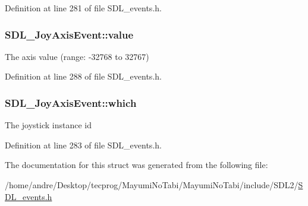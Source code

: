 Definition at line 281 of file S\-D\-L\-\_\-events.\-h.

\hypertarget{struct_s_d_l___joy_axis_event_a53ee73e7c367934dd6edb69963be5556}{
\subsubsection[{value}]{ S\-D\-L\-\_\-\-Joy\-Axis\-Event\-::value}}\label{struct_s_d_l___joy_axis_event_a53ee73e7c367934dd6edb69963be5556}
The axis value (range\-: -\/32768 to 32767) 

Definition at line 288 of file S\-D\-L\-\_\-events.\-h.

\hypertarget{struct_s_d_l___joy_axis_event_a965719f4703a7091bcc5f07f79fcf7e1}{
\subsubsection[{which}]{ S\-D\-L\-\_\-\-Joy\-Axis\-Event\-::which}}\label{struct_s_d_l___joy_axis_event_a965719f4703a7091bcc5f07f79fcf7e1}
The joystick instance id 

Definition at line 283 of file S\-D\-L\-\_\-events.\-h.



The documentation for this struct was generated from the following file\-:\begin{DoxyCompactItemize}
\item 
/home/andre/\-Desktop/tecprog/\-Mayumi\-No\-Tabi/\-Mayumi\-No\-Tabi/include/\-S\-D\-L2/\hyperlink{_s_d_l__events_8h}{S\-D\-L\-\_\-events.\-h}\end{DoxyCompactItemize}
